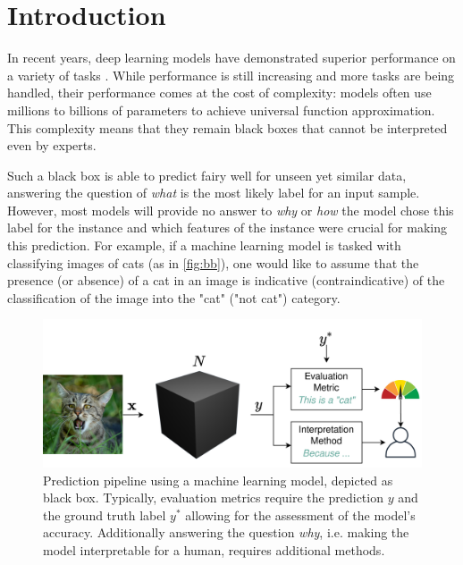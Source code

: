 \section{Introduction}
\label{sec:introduction}

In recent years, deep learning models have demonstrated superior performance on a variety of tasks \cite{ruede2020multi, brinker2019deep, nguyen2020super}. While performance is still increasing and more tasks are being handled, their performance comes at the cost of complexity: models often use millions to billions of parameters to achieve universal function approximation.
This complexity means that they remain black boxes that cannot be interpreted even by experts.


Such a black box is able to predict fairy well for unseen yet similar data, answering the question of \textit{what} is the most likely label for an input sample. However, most models will provide no answer to \textit{why} or \textit{how} the model chose this label for the instance and which features of the instance were crucial for making this prediction. For example, if a machine learning model is tasked with classifying images of cats (as in \autoref{fig:bb}), one would like to assume that the presence (or absence) of a cat in an image is indicative (contraindicative) of the classification of the image into the "cat" ("not cat") category.

\begin{figure}[t]
    \centering
    \includegraphics[width=\linewidth]{figures/bb_cat.png}
    \caption{Prediction pipeline using a machine learning model, depicted as black box. Typically, evaluation metrics require the prediction $y$ and the ground truth label $y^*$ allowing for the assessment of the model's accuracy. Additionally answering the question \textit{why}, i.e. making the model interpretable for a human, requires additional methods.}
    \label{fig:bb}
    \vspace{-0.3cm}
\end{figure}

